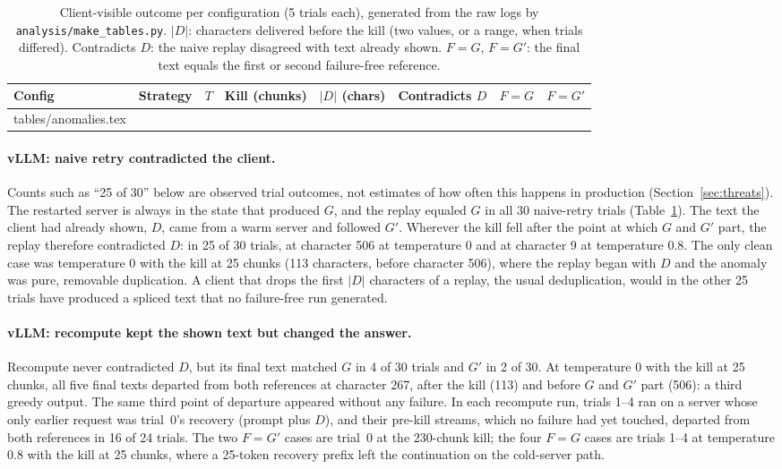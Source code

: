 \documentclass[10pt,twocolumn]{article}
\makeatletter
\def\AnomRows{\@@input tables/anomalies.tex }
\makeatother
\begin{document}
\begin{table}[t]
\centering\small
\caption{Client-visible outcome per configuration (5 trials each), generated
from the raw logs by \texttt{analysis/make\_tables.py}. $|D|$: characters
delivered before the kill (two values, or a range, when trials differed).
Contradicts $D$: the naive replay disagreed with text already shown.
$F{=}G$, $F{=}G'$: the final text equals the first or second failure-free
reference.}
\label{tab:anomalies}
\begin{tabular}{@{}llrrrccc@{}}
\toprule
Config & Strategy & $T$ & Kill (chunks) & $|D|$ (chars) & Contradicts $D$ & $F{=}G$ & $F{=}G'$ \\
\midrule
\AnomRows
\bottomrule
\end{tabular}
\end{table}

\paragraph{vLLM: naive retry contradicted the client.} Counts such as
``25 of 30'' below are observed trial outcomes, not estimates of how often
this happens in production (Section~\ref{sec:threats}). The restarted server is
always in the state that produced $G$, and the replay equaled $G$ in all
30 naive-retry trials (Table~\ref{tab:anomalies}). The text the client had
already shown, $D$, came from a warm server and followed $G'$. Wherever the
kill fell after the point at which $G$ and $G'$ part, the replay therefore
contradicted $D$: in 25 of 30 trials, at character 506 at temperature 0 and
at character 9 at temperature 0.8. The only clean case was temperature 0
with the kill at 25 chunks (113 characters, before character 506), where the
replay began with $D$ and the anomaly was pure, removable duplication. A
client that drops the first $|D|$ characters of a replay, the usual
deduplication, would in the other 25 trials have produced a spliced text
that no failure-free run generated.

\paragraph{vLLM: recompute kept the shown text but changed the answer.} Recompute
never contradicted $D$, but its final text matched $G$ in 4 of 30 trials and
$G'$ in 2 of 30. At temperature 0 with the kill at 25 chunks, all five final
texts departed from both references at character 267, after the kill (113)
and before $G$ and $G'$ part (506): a third greedy output. The same third
point of departure appeared without any failure. In each recompute run, trials 1--4 ran on
a server whose only earlier request was trial~0's recovery (prompt plus $D$),
and their pre-kill streams, which no failure had yet touched, departed from
both references in 16 of 24 trials. The two $F{=}G'$ cases are trial~0 at
the 230-chunk kill; the four $F{=}G$ cases are trials 1--4 at temperature
0.8 with the kill at 25 chunks, where a 25-token recovery prefix left the
continuation on the cold-server path.
\end{document}
